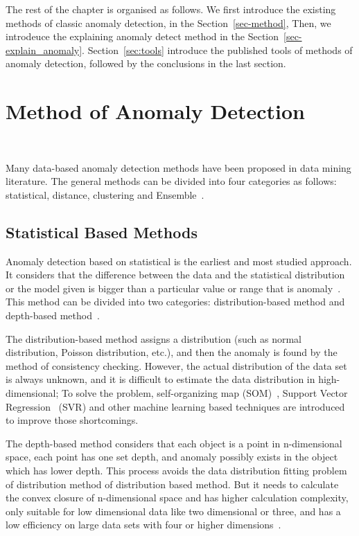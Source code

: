 The rest of the chapter is organised as follows.
We first introduce the existing methods of classic anomaly detection,
in the Section~\ref{sec-method},
Then,
we introdeuce the explaining anomaly detect method
in the Section~\ref{sec-explain_anomaly}.
Section~\ref{sec:tools} introduce the published tools of
methods of anomaly detection,
followed by the conclusions in the last section.

\section{Method of Anomaly Detection}~\label{sec-method}

Many data-based anomaly detection methods have been proposed in
data mining literature.
The general methods can be divided into four categories as follows: 
statistical, 
distance, 
clustering and Ensemble~\cite{cook2019anomaly}.

\subsection{Statistical Based Methods}

Anomaly detection based on statistical is the earliest and
most studied approach.
It considers that the difference
between the data and the statistical distribution or the model
given is bigger than a particular value or range that is
anomaly~\cite{chandola2009anomaly}.
This method can be divided into two
categories: distribution-based method and depth-based
method~\cite{wu2016survey}.

The distribution-based method assigns a distribution (such as
normal distribution,
Poisson distribution,
etc.),
and then the anomaly is found by the method of consistency checking.
However,
the actual distribution of the data set is always unknown,
and it is difficult to
estimate the data distribution in high-dimensional;
To solve the problem, 
self-organizing map (SOM)~\cite{siripanadorn2010anomaly}, 
Support Vector Regression~\cite{kromanis2013support} (SVR) and
other machine learning based techniques are introduced to
improve those shortcomings.

The depth-based method considers that
each object is a point in n-dimensional space,
each point has one set depth,
and anomaly possibly exists in the object which has lower depth.
This process avoids the data distribution fitting problem of
distribution method of distribution based method.
But it needs to calculate
the convex closure of n-dimensional space and has higher
calculation complexity,
only suitable for low dimensional
data like two dimensional or three,
and has a low efficiency
on large data sets with four or higher dimensions~\cite{ruts1996computing}.

